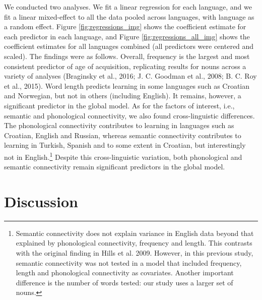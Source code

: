 \documentclass[10pt, letterpaper]{article}
\begin{document}
We conducted two analyses. We fit a linear regression for each language,
and we fit a linear mixed-effect to all the data pooled across
languages, with language as a random effect. Figure
\ref{fig:regressions_img} shows the coefficient estimate for each
predictor in each language, and Figure \ref{fig:regressions_all_img}
shows the coefficient estimates for all languages combined (all
predictors were centered and scaled). The findings were as follows.
Overall, frequency is the largest and most consistent predictor of age
of acquisition, replicating results for nouns across a variety of
analyses (Braginsky et al., 2016; J. C. Goodman et al., 2008; B. C. Roy
et al., 2015). Word length predicts learning in some languages such as
Croatian and Norwegian, but not in others (including English). It
remains, however, a significant predictor in the global model. As for
the factors of interest, i.e., semantic and phonological connectivity,
we also found cross-linguistic differences. The phonological
connectivity contributes to learning in languages such as Croatian,
English and Russian, whereas semantic connectivity contributes to
learning in Turkish, Spanish and to some extent in Croatian, but
interestingly not in
English.\footnote{Semantic connectivity does not explain variance in English data beyond that explained by phonological connectivity, frequency and length. This contrasts with the original finding in Hills et al. 2009. However, in this previous study, semantic connectivity was not tested in a model that included frequency, length and phonological connectivity as covariates. Another important difference is the number of words tested: our study uses a larger set of nouns.}
Despite this cross-linguistic variation, both phonological and semantic
connectivity remain significant predictors in the global model.

\section{Discussion}\label{discussion}
\end{document}
